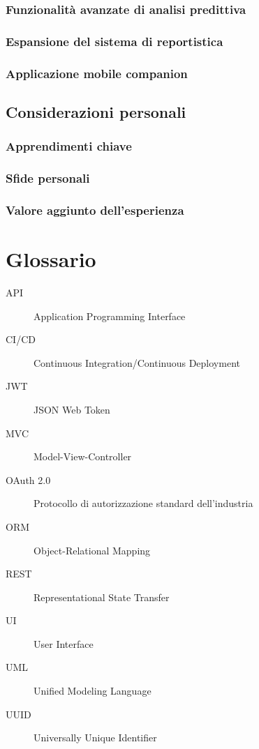 \documentclass[12pt,a4paper,oneside]{report}
\begin{document}
\subsection{Funzionalità avanzate di analisi predittiva}
\subsection{Espansione del sistema di reportistica}
\subsection{Applicazione mobile companion}

\section{Considerazioni personali}
\subsection{Apprendimenti chiave}
\subsection{Sfide personali}
\subsection{Valore aggiunto dell'esperienza}

\appendix

\chapter{Glossario}
\begin{description}
    \item[API] Application Programming Interface
    \item[CI/CD] Continuous Integration/Continuous Deployment
    \item[JWT] JSON Web Token
    \item[MVC] Model-View-Controller
    \item[OAuth 2.0] Protocollo di autorizzazione standard dell'industria
    \item[ORM] Object-Relational Mapping
    \item[REST] Representational State Transfer
    \item[UI] User Interface
    \item[UML] Unified Modeling Language
    \item[UUID] Universally Unique Identifier
\end{description}
\end{document}

